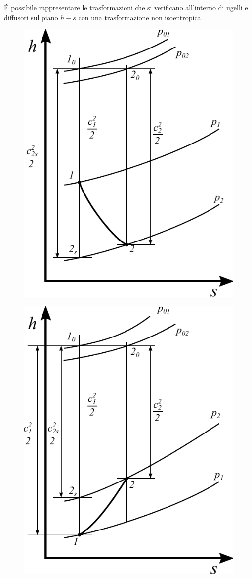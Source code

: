 \'E possibile rappresentare le trasformazioni che si verificano all'interno di ugelli e diffusori sul piano $h-s$ con una trasformazione non isoentropica.
\begin{figure}
\centering
\begin{minipage}{.5\textwidth}
  \centering
  \includegraphics[width=.6\linewidth]{fig/Ugello.pdf}
  \label{}
\end{minipage}%
\begin{minipage}{.5\textwidth}
  \centering
  \includegraphics[width=.6\linewidth]{fig/Diffusore.pdf}
  \label{}
\end{minipage}
\end{figure}
